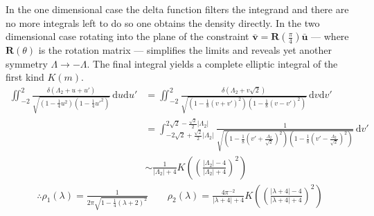 \documentclass{article}[12pt]
\numberwithin{equation}{section}
\begin{document}
\noindent
In the one dimensional case the delta function filters the integrand
and there are no more integrals left to do so one obtains the density
directly. In the two dimensional case rotating into the plane of the
constraint $\bar{\mathbf{v}}=\mathbf{R}(\frac{\pi}{4})\bar{\mathbf{u}}$
--- where $\mathbf{R}(\theta)$ is the rotation matrix --- simplifies
the limits and reveals yet another symmetry $\Lambda\rightarrow-\Lambda$.
The final integral yields a complete elliptic integral of the first kind $K(m)$.
\begin{align*}
  \iint_{-2}^{2}\!
  \frac{\delta(\Lambda_2+u+u')}
  {\sqrt{(1-\frac{1}{4}u^2)(1-\frac{1}{4}u'^2)}}
  \,\mathrm{d}u\mathrm{d}u'
  &=
  \iint_{-2}^{2}\!
  \frac{\delta(\Lambda_2+v\sqrt{2})}
  {\sqrt{(1-\frac{1}{8}(v+v')^2)(1-\frac{1}{8}(v-v')^2)}}
  \,\mathrm{d}v\mathrm{d}v'\\
  &=
  \int_{-2\sqrt{2}+\frac{\sqrt{2}}{2}|\Lambda_2|}^{2\sqrt{2}-\frac{\sqrt{2}}{2}|\Lambda_2|}\!
  \frac{1}
  {\sqrt{(1-\frac{1}{8}(v'+\frac{\Lambda_2}{\sqrt{2}})^2)(1-\frac{1}{8}(v'-\frac{\Lambda_2}{\sqrt{2}})^2)}}
  \,\mathrm{d}v'\\
  &\sim
  \frac{1}{|\Lambda_2|+4}
  K\left(\left(\frac{|\Lambda_2|-4}{|\Lambda_2|+4}\right)^2\right)
\end{align*}
\begin{align}
  \therefore \rho_1(\lambda)=
  \frac{1}
  {2\pi\sqrt{1-\frac{1}{4}(\lambda+2)^2}}
  \qquad
  \rho_2(\lambda)=\frac{4\pi^{-2}}{|\lambda+4|+4}
    K\left(\left(\frac{|\lambda+4|-4}{|\lambda+4|+4}\right)^2\right)
\end{align}
\end{document}
